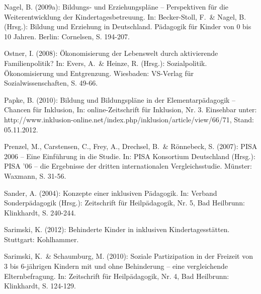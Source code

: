 Nagel, B. (2009a): Bildungs- und Erziehungspläne – Perspektiven für die Weiterentwicklung der Kindertagesbetreuung. In: Becker-Stoll, F.~\& Nagel, B. (Hrsg.): Bildung und Erziehung in Deutschland. Pädagogik für Kinder von 0 bis 10 Jahren. Berlin: Cornelsen, S. 194-207.

Ostner, I. (2008): Ökonomisierung der Lebenswelt durch aktivierende Familienpolitik? In: Evers, A.~\& Heinze, R. (Hrsg.): Sozialpolitik. Ökonomisierung und Entgrenzung. Wiesbaden: VS-Verlag für Sozialwissenschaften, S. 49-66.

Papke, B. (2010): Bildung und Bildungspläne in der Elementarpädagogik – Chancen für Inklusion, In: online-Zeitschrift für Inklusion, Nr. 3. Einsehbar unter: http://www.inklusion-online.net/index.php/inklusion/article/view/66/71, Stand: 05.11.2012. 

Prenzel, M., Carstensen, C., Frey, A., Drechsel, B.~\& Rönnebeck, S. (2007): PISA 2006 – Eine Einführung in die Studie. In: PISA Konsortium Deutschland (Hrsg.): PISA '06 – die Ergebnisse der dritten internationalen Vergleichsstudie. Münster: Waxmann, S. 31-56.


Sander, A. (2004): Konzepte einer inklusiven Pädagogik. In: Verband Sonderpädagogik (Hrsg.): Zeitschrift für Heilpädagogik, Nr. 5, Bad Heilbrunn: Klinkhardt, S. 240-244.


Sarimski, K. (2012): Behinderte Kinder in inklusiven Kindertagesstätten. Stuttgart: Kohlhammer. 

Sarimski, K.~\& Schaumburg, M. (2010): Soziale Partizipation in der Freizeit von 3 bis 6-jährigen Kindern mit und ohne Behinderung -- eine vergleichende Elternbefragung. In: Zeitschrift für Heilpädagogik, Nr. 4, Bad Heilbrunn: Klinkhardt, S. 124-129.




